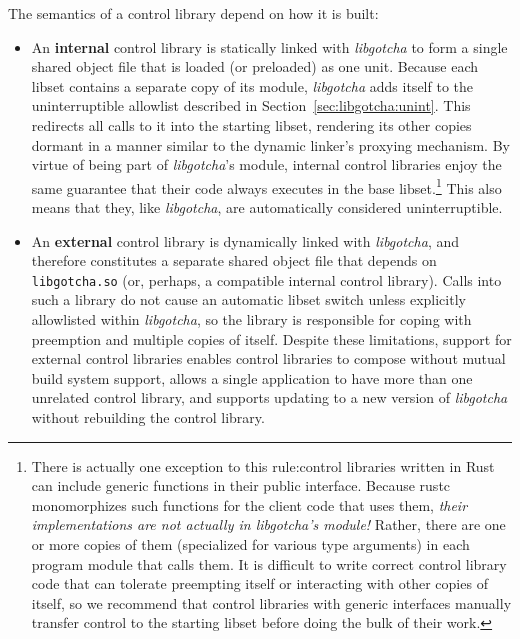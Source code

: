 The semantics of a control library depend on how it is built:
\begin{itemize}
\item An \textbf{internal} control library is statically linked with
	\textit{libgotcha} to form a single shared object file that is loaded (or
	preloaded) as one unit.  Because each libset contains a separate copy of
	its module, \textit{libgotcha} adds itself to the uninterruptible allowlist
	described in Section~\ref{sec:libgotcha:unint}.  This redirects all calls to
	it into the starting libset, rendering its other copies dormant in a manner
	similar to the dynamic linker's proxying mechanism.  By virtue of being part
	of \textit{libgotcha}'s module, internal control libraries enjoy the same
	guarantee that their code always executes in the base libset.\footnote{There
	is actually one exception to this rule:\@ control libraries written in Rust
	can include generic functions in their public interface.  Because rustc
	monomorphizes such functions for the client code that uses them,
	\textit{their implementations are not actually in \textrm{libgotcha}'s
	module!}  Rather, there are one or more copies of them (specialized for
	various type arguments) in each program module that calls them.  It is
	difficult to write correct control library code that can tolerate preempting
	itself or interacting with other copies of itself, so we recommend that
	control libraries with generic interfaces manually transfer control to the
	starting libset before doing the bulk of their work.}  This also means that
	they, like \textit{libgotcha}, are automatically considered uninterruptible.
\item An \textbf{external} control library is dynamically linked with
	\textit{libgotcha}, and therefore constitutes a separate shared object file
	that depends on \texttt{libgotcha.so} (or, perhaps, a compatible internal
	control library).  Calls into such a library do not cause an automatic libset
	switch unless explicitly allowlisted within \textit{libgotcha}, so the
	library is responsible for coping with preemption and multiple copies of
	itself.  Despite these limitations, support for external control libraries
	enables control libraries to compose without mutual build system support,
	allows a single application to have more than one unrelated control library,
	and supports updating to a new version of \textit{libgotcha} without
	rebuilding the control library.
\end{itemize}


